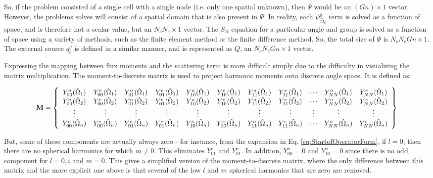 \documentclass[10pt]{article}
\newcommand{\hO}{\hat{\Omega}}
\begin{document}
\begin{flushleft}
So, if the problem consisted of a single cell with a single node (i.e. only one spatial unknown), then \(\Psi\) would be an \((Gn)\times1\) vector. However, the problems solves will consist of a spatial domain that is also present in \(\Psi\). In reality, each \(\psi_{\hO  _n}^g\) term is solved as a function of space, and is therefore not a scalar value, but an \(N_cN_e\times1\) vector. The \(S_N\) equation for a particular angle and group is solved as a function of space using a variety of methods, such as the finite element method or the finite difference method. So, the total size of \(\Psi\) is \(N_cN_eGn\times1\). The external source \(q_e^g\) is defined in a similar manner, and is represented as \(Q\), an \(N_cN_eGn\times1\) vector.

Expressing the mapping between flux moments and the scattering term is more difficult simply due to the difficulty in visualizing the matrix multiplication. The moment-to-discrete matrix is used to project harmonic moments onto discrete angle space. It is defined as:

\begin{equation}
\textbf{M}=\left\{
\begin{array}{*{13}c}
Y_{00}^o(\hO  _1) & Y_{00}^e(\hO  _1) & Y_{01}^o(\hO  _1) & Y_{01}^e(\hO  _1) & Y_{10}^o(\hO  _1) & Y_{10}^e(\hO  _1) & Y_{11}^o(\hO  _1) & Y_{11}^e(\hO  _1) & \cdots & Y_{NN}^o(\hO  _1) & Y_{NN}^e(\hO  _1)\\
Y_{00}^o(\hO  _2) & Y_{00}^e(\hO  _2) & Y_{01}^o(\hO  _2) & Y_{01}^e(\hO  _2) & Y_{10}^o(\hO  _2) & Y_{10}^e(\hO  _2) & Y_{11}^o(\hO  _2) & Y_{11}^e(\hO  _2) & \cdots & Y_{NN}^o(\hO  _2) & Y_{NN}^e(\hO  _2)\\
\vdots & \vdots & \vdots & \vdots & \vdots & \vdots & \vdots & \vdots & \vdots & \vdots & \vdots \\
Y_{00}^o(\hO  _n) & Y_{00}^e(\hO  _n) & Y_{01}^o(\hO  _n) & Y_{01}^e(\hO  _n) & Y_{10}^o(\hO  _n) & Y_{10}^e(\hO  _n) & Y_{11}^o(\hO  _n) & Y_{11}^e(\hO  _n) & \cdots & Y_{NN}^o(\hO  _n) & Y_{NN}^e(\hO  _n)\\
\end{array}\right\}
\end{equation}

But, some of these components are actually always zero - for instance, from the expansion in Eq. \eqref{eq:StartofOperatorForm}, if \(l=0\), then there are no spherical harmonics for which \(m\neq0\). This eliminates \(Y_{01}^e\) and \(Y_{01}^o\). In addition, \(Y_{00}^o=0\) and \(Y_{10}^o=0\) since there is no odd component for \(l=0,i\) and \(m=0\). This gives a simplified version of the moment-to-discrete matrix, where the only difference between this matrix and the more explicit one above is that several of the low \(l\) and \(m\) spherical harmonics that are zero are removed.


\end{flushleft}
\end{document}
